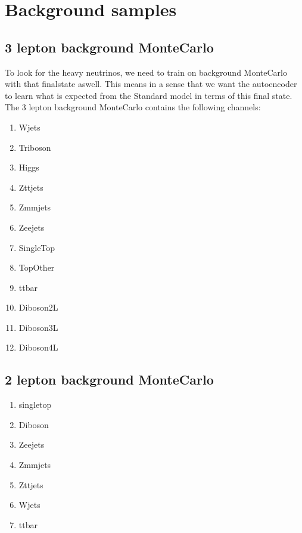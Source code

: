 \section*{Background samples}

\subsection*{3 lepton background MonteCarlo}
To look for the heavy neutrinos, we need to train on background MonteCarlo with that finalstate aswell. This means in a sense that 
we want the autoencoder to learn what is expected from the Standard model in terms of this final state. The 3 lepton background MonteCarlo 
contains the following channels:

\begin{enumerate}
    \item Wjets
    \item Triboson
    \item Higgs
    \item Zttjets
    \item Zmmjets
    \item Zeejets
    \item SingleTop
    \item TopOther
    \item ttbar
    \item Diboson2L
    \item Diboson3L
    \item Diboson4L
   
\end{enumerate}


\subsection*{2 lepton background MonteCarlo}

\begin{enumerate}
    \item singletop 
    \item Diboson 
    \item Zeejets 
    \item Zmmjets 
    \item Zttjets 
    \item Wjets 
    \item ttbar
   
\end{enumerate}

 